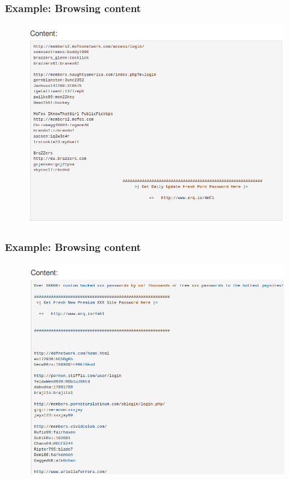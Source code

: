 \documentclass{beamer}
\begin{document}
\begin{frame}
    \frametitle{Example: Browsing content}
    \begin{figure}
        \includegraphics[scale=0.3, angle=0]{images/ail_04.png}
    \end{figure}
\end{frame}


\begin{frame}
    \frametitle{Example: Browsing content}
    \begin{figure}
        \includegraphics[scale=0.3, angle=0]{images/ail_06.png}
    \end{figure}
\end{frame}
\end{document}
